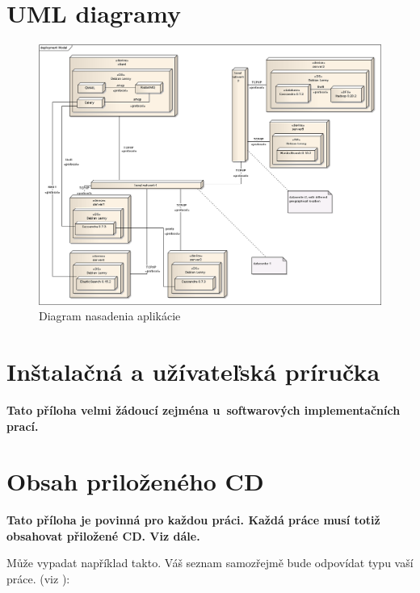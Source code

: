 \documentclass[11pt,twoside,a4paper]{book}
\begin{document}
\chapter{UML diagramy}


\begin{figure}[h]
 \centering
 \includegraphics[width=16cm]{./figures/deploy.png}
 \caption{Diagram nasadenia aplikácie}
 \label{fig:Deployment}
\end{figure}


\chapter{Inštalačná a užívateľská príručka}
\textbf{\large Tato příloha velmi žádoucí zejména u~softwarových implementačních prací.}


\chapter{Obsah priloženého CD}
\textbf{\large Tato příloha je povinná pro každou práci. Každá práce musí totiž obsahovat přiložené CD. Viz dále.}

Může vypadat například takto. Váš seznam samozřejmě bude odpovídat typu vaší práce. (viz \cite{infodp}):
\end{document}
